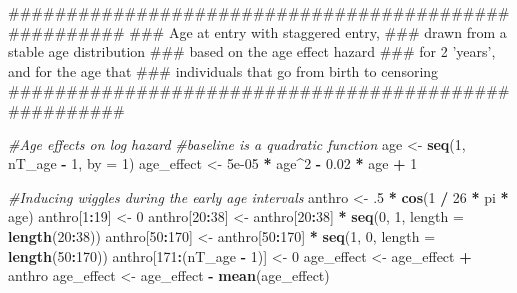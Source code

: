 \documentclass[11pt,]{article}
\newenvironment{Shaded}{\begin{snugshade}}{\end{snugshade}}
\newcommand{\KeywordTok}[1]{\textcolor[rgb]{0.13,0.29,0.53}{\textbf{#1}}}
\newcommand{\DataTypeTok}[1]{\textcolor[rgb]{0.13,0.29,0.53}{#1}}
\newcommand{\DecValTok}[1]{\textcolor[rgb]{0.00,0.00,0.81}{#1}}
\newcommand{\FloatTok}[1]{\textcolor[rgb]{0.00,0.00,0.81}{#1}}
\newcommand{\StringTok}[1]{\textcolor[rgb]{0.31,0.60,0.02}{#1}}
\newcommand{\CommentTok}[1]{\textcolor[rgb]{0.56,0.35,0.01}{\textit{#1}}}
\newcommand{\OperatorTok}[1]{\textcolor[rgb]{0.81,0.36,0.00}{\textbf{#1}}}
\newcommand{\NormalTok}[1]{#1}
\begin{document}
\begin{Shaded}
\begin{Highlighting}[]
\NormalTok{  #####################################################}
\NormalTok{  ### Age at entry with staggered entry,}
\NormalTok{  ### drawn from a stable age distribution}
\NormalTok{  ### based on the age effect hazard}
\NormalTok{  ### for 2 'years', and for the age that}
\NormalTok{  ### individuals that go from birth to censoring}
\NormalTok{  #####################################################}

  \CommentTok{#Age effects on log hazard}
  \CommentTok{#baseline is a quadratic function}
\NormalTok{  age <-}\StringTok{ }\KeywordTok{seq}\NormalTok{(}\DecValTok{1}\NormalTok{, nT_age }\OperatorTok{-}\StringTok{ }\DecValTok{1}\NormalTok{, }\DataTypeTok{by =} \DecValTok{1}\NormalTok{) }
\NormalTok{  age_effect <-}\StringTok{ }\FloatTok{5e-05} \OperatorTok{*}\StringTok{ }\NormalTok{age}\OperatorTok{^}\DecValTok{2} \OperatorTok{-}\StringTok{ }\FloatTok{0.02} \OperatorTok{*}\StringTok{ }\NormalTok{age }\OperatorTok{+}\StringTok{ }\DecValTok{1} 

  \CommentTok{#Inducing wiggles during the early age intervals}
\NormalTok{  anthro <-}\StringTok{ }\NormalTok{.}\DecValTok{5} \OperatorTok{*}\StringTok{ }\KeywordTok{cos}\NormalTok{(}\DecValTok{1} \OperatorTok{/}\StringTok{ }\DecValTok{26} \OperatorTok{*}\StringTok{ }\NormalTok{pi }\OperatorTok{*}\StringTok{ }\NormalTok{age)}
\NormalTok{  anthro[}\DecValTok{1}\OperatorTok{:}\DecValTok{19}\NormalTok{] <-}\StringTok{ }\DecValTok{0}
\NormalTok{  anthro[}\DecValTok{20}\OperatorTok{:}\DecValTok{38}\NormalTok{] <-}\StringTok{ }\NormalTok{anthro[}\DecValTok{20}\OperatorTok{:}\DecValTok{38}\NormalTok{] }\OperatorTok{*}\StringTok{ }\KeywordTok{seq}\NormalTok{(}\DecValTok{0}\NormalTok{, }\DecValTok{1}\NormalTok{, }\DataTypeTok{length =} \KeywordTok{length}\NormalTok{(}\DecValTok{20}\OperatorTok{:}\DecValTok{38}\NormalTok{))}
\NormalTok{  anthro[}\DecValTok{50}\OperatorTok{:}\DecValTok{170}\NormalTok{] <-}\StringTok{ }\NormalTok{anthro[}\DecValTok{50}\OperatorTok{:}\DecValTok{170}\NormalTok{] }\OperatorTok{*}\StringTok{ }\KeywordTok{seq}\NormalTok{(}\DecValTok{1}\NormalTok{, }\DecValTok{0}\NormalTok{, }\DataTypeTok{length =} \KeywordTok{length}\NormalTok{(}\DecValTok{50}\OperatorTok{:}\DecValTok{170}\NormalTok{))}
\NormalTok{  anthro[}\DecValTok{171}\OperatorTok{:}\NormalTok{(nT_age }\OperatorTok{-}\StringTok{ }\DecValTok{1}\NormalTok{)] <-}\StringTok{ }\DecValTok{0} 
\NormalTok{  age_effect <-}\StringTok{ }\NormalTok{age_effect }\OperatorTok{+}\StringTok{ }\NormalTok{anthro}
\NormalTok{  age_effect <-}\StringTok{ }\NormalTok{age_effect }\OperatorTok{-}\StringTok{ }\KeywordTok{mean}\NormalTok{(age_effect)}


\end{Highlighting}
\end{Shaded}
\end{document}
